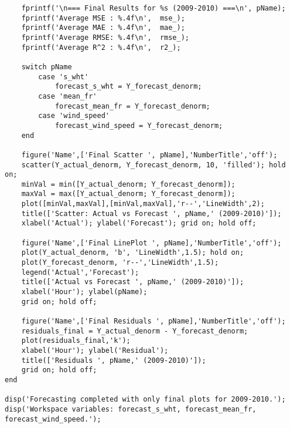 \begin{verbatim}
    fprintf('\n=== Final Results for %s (2009-2010) ===\n', pName);
    fprintf('Average MSE : %.4f\n',  mse_);
    fprintf('Average MAE : %.4f\n',  mae_);
    fprintf('Average RMSE: %.4f\n',  rmse_);
    fprintf('Average R^2 : %.4f\n',  r2_);
    
    switch pName
        case 's_wht'
            forecast_s_wht = Y_forecast_denorm;
        case 'mean_fr'
            forecast_mean_fr = Y_forecast_denorm;
        case 'wind_speed'
            forecast_wind_speed = Y_forecast_denorm;
    end
    
    figure('Name',['Final Scatter ', pName],'NumberTitle','off');
    scatter(Y_actual_denorm, Y_forecast_denorm, 10, 'filled'); hold on;
    minVal = min([Y_actual_denorm; Y_forecast_denorm]);
    maxVal = max([Y_actual_denorm; Y_forecast_denorm]);
    plot([minVal,maxVal],[minVal,maxVal],'r--','LineWidth',2);
    title(['Scatter: Actual vs Forecast ', pName,' (2009-2010)']);
    xlabel('Actual'); ylabel('Forecast'); grid on; hold off;
    
    figure('Name',['Final LinePlot ', pName],'NumberTitle','off');
    plot(Y_actual_denorm, 'b', 'LineWidth',1.5); hold on;
    plot(Y_forecast_denorm, 'r--','LineWidth',1.5);
    legend('Actual','Forecast');
    title(['Actual vs Forecast ', pName,' (2009-2010)']);
    xlabel('Hour'); ylabel(pName);
    grid on; hold off;
    
    figure('Name',['Final Residuals ', pName],'NumberTitle','off');
    residuals_final = Y_actual_denorm - Y_forecast_denorm;
    plot(residuals_final,'k');
    xlabel('Hour'); ylabel('Residual');
    title(['Residuals ', pName,' (2009-2010)']);
    grid on; hold off;
end

disp('Forecasting completed with only final plots for 2009-2010.');
disp('Workspace variables: forecast_s_wht, forecast_mean_fr, forecast_wind_speed.');
\end{verbatim}